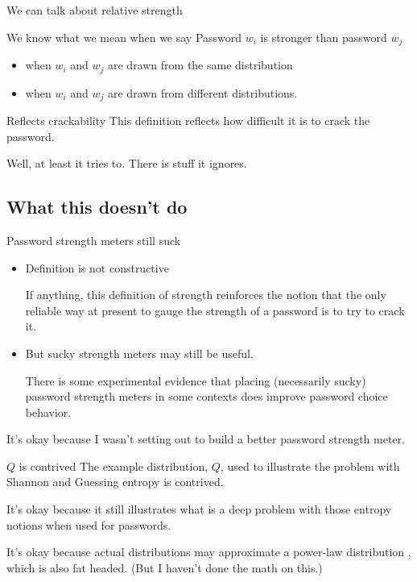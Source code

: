 \documentclass[xcolor={dvipsnames,table}]{beamer}
\newcommand\itsok[1]{\vspace{0.5ex} \textcolor{Mahogany}{\colorbox{Goldenrod!20}{It's okay} because #1}}
\begin{document}
\begin{frame}{We can talk about relative strength}

We know what we mean when we say Password $w_i$ is stronger than password $w_j$
\begin{itemize}
\item when $w_i$ and $w_j$ are drawn from the same distribution
\item when $w_i$ and $w_j$ are drawn from different distributions.
\end{itemize}

\end{frame}

\begin{frame}{Reflects crackability}
This definition reflects how difficult it is to crack the password.

\pause
Well, at least it tries to. There is stuff it ignores.
\end{frame}

\subsection{What this doesn't do}

\begin{frame}{Password strength meters still suck}
\begin{itemize}
\item Definition is not constructive

       If anything, this definition of strength reinforces the notion that the only reliable way at present to gauge the strength of a password is to try to crack it.

\item But sucky strength meters may still be useful.

       There is some experimental evidence that placing (necessarily sucky) password strength meters in some contexts does improve password choice behavior. \parencite{EgelmanETAL13:SIGCHI}
\end{itemize}

\pause
\itsok{I wasn't setting out to build a better password strength meter.}

\end{frame}

\begin{frame}{\(Q\) is contrived}
The example distribution, $Q$, used to illustrate the problem with Shannon and Guessing entropy is contrived.

\pause
\itsok{it still illustrates what is a deep problem with those entropy notions when used for passwords.}

\pause
\itsok{actual distributions may approximate a power-law distribution \parencite{MaloneMaher11:CoRR}, which is also fat headed. (But I haven't done the math on this.)}

\end{frame}
\end{document}
